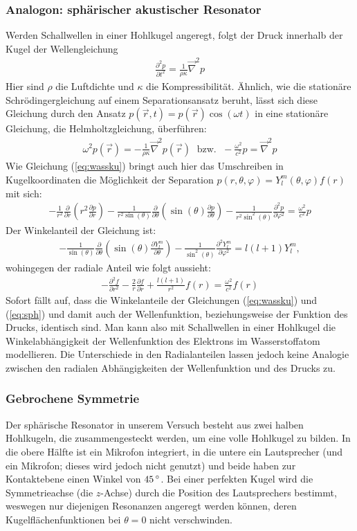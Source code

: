 \documentclass[numbers=noenddot,12pt,a4paper]{scrartcl}
\newcommand{\degree}{^\circ}
\newcommand{\partiell}[2]{\frac{\partial #1}{\partial #2}}
\newcommand{\partiellz}[2]{\frac{\partial^2 #1}{\partial #2^2}}
\begin{document}
\subsubsection{Analogon: sphärischer akustischer Resonator}
Werden Schallwellen in einer Hohlkugel angeregt, folgt der Druck innerhalb der Kugel der Wellengleichung
\begin{align}
\partiellz{p}{t}=\frac{1}{\rho\kappa}\vec{\nabla}^2p
\end{align}
Hier sind $\rho$ die Luftdichte und $\kappa$ die Kompressibilität. Ähnlich, wie die stationäre Schrödingergleichung auf einem Separationsansatz beruht, lässt sich diese Gleichung durch den Ansatz $p(\vec{r},t)=p(\vec{r})\cos(\omega t)$ in eine stationäre Gleichung, die Helmholtzgleichung, überführen:
\begin{align}
\omega^2p(\vec{r})=-\frac{1}{\rho\kappa}\vec{\nabla}^2p(\vec{r})\;\text{ bzw. }\;-\frac{\omega^2}{c^2}p=\vec{\nabla}^2p
\end{align}
Wie Gleichung (\ref{eq:wassku}) bringt auch hier das Umschreiben in Kugelkoordinaten die Möglichkeit der Separation $p(r,\theta,\varphi)=Y_l^m(\theta,\varphi)f(r)$ mit sich:
\begin{align}
-\frac{1}{r^2}\partiell{}{r}\left(r^2\partiell{p}{r}\right)-\frac{1}{r^2\sin(\theta)}\partiell{}{\theta}\left(\sin(\theta)\partiell{p}{\theta}\right)-\frac{1}{r^2\sin^2(\theta)}\partiellz{p}{\varphi}=\frac{\omega^2}{c^2}p\label{eq:sph}
\end{align}
Der Winkelanteil der Gleichung ist:
\begin{align}
-\frac{1}{\sin(\theta)}\partiell{}{\theta}\left(\sin(\theta)\partiell{Y_l^m}{\theta}\right)-\frac{1}{\sin^2(\theta)}\partiellz{Y_l^m}{\varphi}=l(l+1)Y_l^m,
\end{align}
wohingegen der radiale Anteil wie folgt aussieht:
\begin{align}
-\partiellz{f}{r}-\frac{2}{r}\partiell{f}{r}+\frac{l(l+1)}{r^2}f(r)=\frac{\omega^2}{c^2}f(r)
\end{align}
Sofort fällt auf, dass die Winkelanteile der Gleichungen (\ref{eq:wassku}) und (\ref{eq:sph}) und damit auch der Wellenfunktion, beziehungsweise der Funktion des Drucks, identisch sind. Man kann also mit Schallwellen in einer Hohlkugel die Winkelabhängigkeit der Wellenfunktion des Elektrons im Wasserstoffatom modellieren. Die Unterschiede in den Radialanteilen lassen jedoch keine Analogie zwischen den radialen Abhängigkeiten der Wellenfunktion und des Drucks zu.
\subsubsection{Gebrochene Symmetrie}
Der sphärische Resonator in unserem Versuch besteht aus zwei halben Hohlkugeln, die zusammengesteckt werden, um eine volle Hohlkugel zu bilden. In die obere Hälfte ist ein Mikrofon integriert, in die untere ein Lautsprecher (und ein Mikrofon; dieses wird jedoch nicht genutzt) und beide haben zur Kontaktebene einen Winkel von $\unit[45]{\degree}$. Bei einer perfekten Kugel wird die Symmetrieachse (die $z$-Achse) durch die Position des Lautsprechers bestimmt, weswegen nur diejenigen Resonanzen angeregt werden können, deren Kugelflächenfunktionen bei $\theta=0$ nicht verschwinden.
\end{document}
